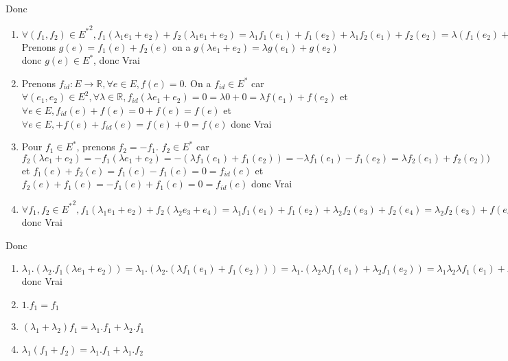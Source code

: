 \documentclass[]{book}
\theoremstyle{definition}
\newcommand{\bb}[1]{\mathbb{#1}}
\newcommand{\R}{\bb{R}}
\begin{document}
Donc
\begin{enumerate}
\item $\forall (f_1, f_2) \in {E^{*}}^2, f_1(\lambda_1 e_1 + e_2) + f_2(\lambda_1 e_1 + e_2) =  \lambda_1 f_1(e_1) + f_1(e_2) + \lambda_1 f_2(e_1) + f_2(e_2) = \lambda(f_1(e_2) + f_2(e_1)) + (f_1(e_2) + f_2(e_2))$ Prenons $g(e) = f_1(e) + f_2(e)$ on a $g(\lambda e_1 + e_2) = \lambda g(e_1) + g(e_2)$ donc $g(e) \in E^{*}$, donc Vrai
\item Prenons $f_{id} : E \to \R, \forall e \in E, f(e) = 0$. On a $f_{id} \in E^{*}$ car $\forall (e_1,e_2) \in E^2, \forall \lambda \in \R, f_{id}(\lambda e_1 + e_2) = 0 = \lambda 0 + 0 = \lambda f(e_1) + f(e_2)$ et $\forall e \in E, f_{id}(e) + f(e) = 0 + f(e) = f(e)$ et $\forall e \in E, + f(e) + f_{id}(e)= f(e) + 0 = f(e)$ donc Vrai
\item Pour $f_1 \in E^{*}$, prenons $f_2 = -f_1$. $f_2 \in E^{*}$ car $f_2(\lambda e_1 + e_2) = -f_1(\lambda e_1 + e_2) = -(\lambda f_1(e_1) + f_1(e_2)) = -\lambda f_1(e_1) - f_1(e_2) = \lambda f_2(e_1) + f_2(e_2))$ et $f_1(e) + f_2(e) = f_1(e) - f_1(e) = 0 = f_{id}(e)$ et $f_2(e) + f_1(e) = -f_1(e) + f_1(e) = 0 = f_{id}(e)$ donc Vrai
\item $\forall f_1, f_2 \in {E^{*}}^2, f_1(\lambda_1 e_1 + e_2) + f_2(\lambda_2 e_3 + e_4) = \lambda_1 f_1(e_1) + f_1(e_2) + \lambda_2 f_2(e_3) + f_2(e_4) =  \lambda_2 f_2(e_3) + f(e_4) + \lambda_1 f_1(e_1) + f_1(e_2) = f_2(\lambda_2 e_3 + e_4) + f_1(\lambda_1 e_1 + e_2)$ donc Vrai
\end{enumerate}


Donc
\begin {enumerate}
\item $\lambda_1.(\lambda_2 . f_1(\lambda e_1 + e_2)) = \lambda_1.(\lambda_2 . (\lambda f_1(e_1) + f_1(e_2))) = \lambda_1.( \lambda_2 \lambda f_1(e_1) + \lambda_2 f_1(e_2)) = \lambda_1 \lambda_2 \lambda f_1(e_1) + \lambda_1 \lambda_2 f_1(e_2) = (\lambda_1 \lambda_2) . (\lambda f_1(e_1) + f_1(e_2)) = (\lambda_1 \lambda_2) . f_1(\lambda e_1 + e_2))$ donc Vrai
\item $1 . f_1 = f_1$
\item $(\lambda_1 + \lambda_2) f_1 = \lambda_1 . f_1 + \lambda_2 . f_1 $
\item $\lambda_1 ( f_1 + f_2) = \lambda_1 . f_1 + \lambda_1 . f_2$
\end{enumerate}
\end{document}
